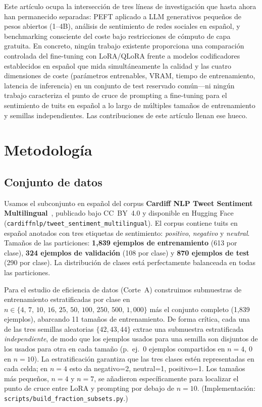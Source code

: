 \documentclass[conference]{IEEEtran}
\begin{document}
\medskip
\noindent
Este artículo ocupa la intersección de tres líneas de investigación que hasta
ahora han permanecido separadas: PEFT aplicado a LLM generativos pequeños de
pesos abiertos (1--4B), análisis de sentimiento de redes sociales en español, y
benchmarking consciente del coste bajo restricciones de cómputo de capa
gratuita.
En concreto, ningún trabajo existente proporciona una comparación controlada del
fine-tuning con LoRA/QLoRA frente a modelos codificadores establecidos en
español que mida simultáneamente la calidad y las cuatro dimensiones de coste
(parámetros entrenables, VRAM, tiempo de entrenamiento, latencia de inferencia)
en un conjunto de test reservado común---ni ningún trabajo caracteriza el punto
de cruce de prompting a fine-tuning para el sentimiento de tuits en español a lo
largo de múltiples tamaños de entrenamiento y semillas independientes.
Las contribuciones de este artículo llenan ese hueco.


\section{Metodología}
\label{sec:methodology}

\subsection{Conjunto de datos}
\label{sec:methodology_dataset}

Usamos el subconjunto en español del corpus \textbf{Cardiff NLP Tweet Sentiment
Multilingual}~\cite{barbieri2022xlmt}, publicado bajo CC~BY~4.0 y disponible en
Hugging Face (\texttt{cardiffnlp/tweet\_sentiment\_multilingual}).
El corpus contiene tuits en español anotados con tres etiquetas de sentimiento:
\textit{positivo}, \textit{negativo} y \textit{neutral}.
Tamaños de las particiones: \textbf{1{,}839 ejemplos de entrenamiento}
(613 por clase), \textbf{324 ejemplos de validación} (108 por clase) y
\textbf{870 ejemplos de test} (290 por clase).
La distribución de clases está perfectamente balanceada en todas las
particiones.

Para el estudio de eficiencia de datos (Corte~A) construimos submuestras de
entrenamiento estratificadas por clase en $n \in \{4,\, 7,\, 10,\, 16,\, 25,\,
50,\, 100,\, 250,\, 500,\, 1{,}000\}$ más el conjunto completo (1,839 ejemplos),
abarcando 11 tamaños de entrenamiento.
De forma crítica, cada una de las tres semillas aleatorias $\{42, 43, 44\}$
extrae una submuestra estratificada \emph{independiente}, de modo que los
ejemplos usados para una semilla son disjuntos de los usados para otra en cada
tamaño (p.\ ej.\ 0 ejemplos compartidos en $n=4$, 0 en $n=10$).
La estratificación garantiza que las tres clases estén representadas en cada
celda; en $n=4$ esto da negativo=2, neutral=1, positivo=1.
Los tamaños más pequeños, $n=4$ y $n=7$, se añadieron específicamente para
localizar el punto de cruce entre LoRA y prompting por debajo de $n=10$.
(Implementación: \texttt{scripts/build\_fraction\_subsets.py}.)
\end{document}
